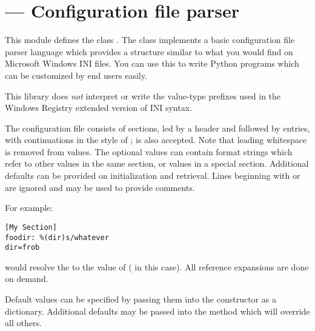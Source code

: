 \section{ ---
         Configuration file parser}


This module defines the class .
The  class implements a basic configuration file
parser language which provides a structure similar to what you would
find on Microsoft Windows INI files.  You can use this to write Python
programs which can be customized by end users easily.

\begin{notice}[warning]
  This library does \emph{not} interpret or write the value-type
  prefixes used in the Windows Registry extended version of INI syntax.
\end{notice}

The configuration file consists of sections, led by a
\samp{[section]} header and followed by  entries,
with continuations in the style of ;  is
also accepted.  Note that leading whitespace is removed from values.
The optional values can contain format strings which refer to other
values in the same section, or values in a special
 section.  Additional defaults can be provided on
initialization and retrieval.  Lines beginning with \character{\#} or
\character{;} are ignored and may be used to provide comments.

For example:

\begin{verbatim}
[My Section]
foodir: %(dir)s/whatever
dir=frob
\end{verbatim}

would resolve the  to the value of
 ( in this case).  All reference expansions are
done on demand.

Default values can be specified by passing them into the
 constructor as a dictionary.  Additional defaults 
may be passed into the  method which will override all
others.

